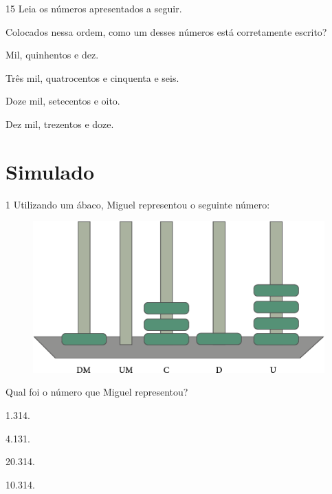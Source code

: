 \num{15} Leia os números apresentados a seguir.


Colocados nessa ordem, como um desses números está corretamente escrito?

\begin{escolha}
\item Mil, quinhentos e dez.

\item Três mil, quatrocentos e cinquenta e seis.

\item Doze mil, setecentos e oito.

\item Dez mil, trezentos e doze.
\end{escolha}
\pagebreak

\chapter[Simulado 2]{Simulado}

\num{1} Utilizando um ábaco, Miguel representou o seguinte número:

\begin{figure}[htpb!]
\centering
\includegraphics[width=\textwidth]{media/image80.png}
\end{figure}

Qual foi o número que Miguel representou?

\begin{multicols}{2}
\begin{escolha}
\item
  1.314.
\item
  4.131.
\item
  20.314.
\item
  10.314.
\end{escolha}
\end{multicols}


